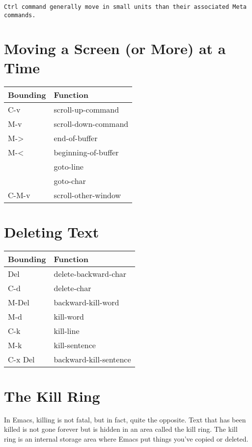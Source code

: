 \documentclass{book}
\newcommand{\head}[1]{\textnormal{\textbf{#1}}}
\begin{document}
\begin{verbatim}
Ctrl command generally move in small units than their associated Meta commands.
\end{verbatim}

\section{Moving a Screen (or More) at a Time}
\begin{tabular}{ll}
  \toprule[1.5pt]
  \head{Bounding} & \head{Function} \\
  \midrule
  C-v      & scroll-up-command   \\
  M-v      & scroll-down-command \\
  M->      & end-of-buffer       \\
  M-<      & beginning-of-buffer \\
  & goto-line           \\
  & goto-char           \\
  C-M-v    & scroll-other-window \\
  \bottomrule
\end{tabular}



\section{Deleting Text}
\begin{tabular}{ll}
  \toprule[1.5pt]
  \head{Bounding} & \head{Function} \\
  \midrule
  Del      & delete-backward-char   \\
  C-d      & delete-char            \\
  \midrule
  M-Del    & backward-kill-word     \\
  M-d      & kill-word              \\
  \midrule
  C-k      & kill-line              \\
  M-k      & kill-sentence          \\
  C-x Del  & backward-kill-sentence \\
  \bottomrule
\end{tabular}

\section{The Kill Ring}
In Emacs, killing is not fatal, but in fact, quite the opposite.
Text that has been killed is not gone forever but is hidden in an area called the kill ring.
The kill ring is an internal storage area where Emacs put things you've copied or deleted. 
\end{document}

